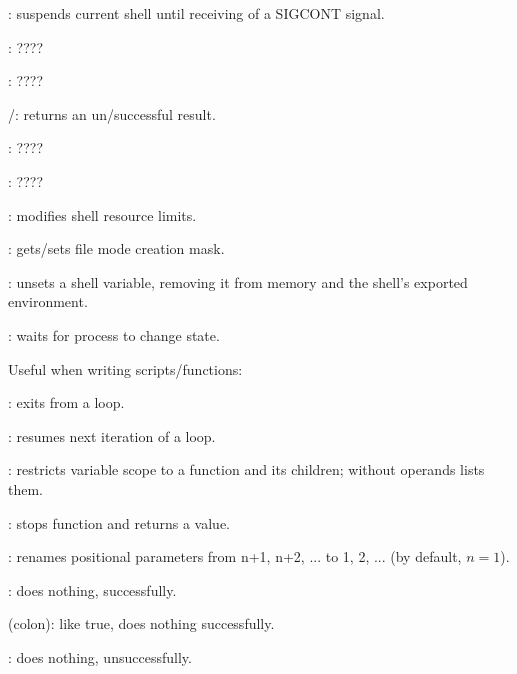 \begin{compactenum}
\item [\symbolbash] : suspends current shell until receiving of a SIGCONT signal.

\item [\symbolbash] : \dotfill ????

\item [\symbolbash] : \dotfill ????

\item [\symbolbash] /: returns an un/successful result.

\item [\symbolbash] : \dotfill ????

\item [\symbolbash] : \dotfill ????

\item [\symbolbash] : modifies shell resource limits.

\item [\symbolbash] : gets/sets file mode creation mask.

\item [\symbolbash] : unsets a shell variable, removing it from memory and the shell's exported environment.

\item [\symbolbash] : waits for process to change state.
\end{compactenum}

Useful when writing scripts/functions:

\begin{compactenum}
\item [\symbolbash] : exits from a loop.
\item [\symbolbash] : resumes next iteration of a loop.

\item [\symbolbash] : restricts variable scope to a function and its children; without operands lists them.

\item [\symbolbash] : stops function and returns a value.

\item [\symbolbash] : renames positional parameters from n+1, n+2, ... to 1, 2, ... (by default, $n = 1$).

\item [\symbolbash] : does nothing, successfully.
\item [\symbolbash] \commandbash{:} (colon): like true, does nothing successfully.
\item [\symbolbash] : does nothing, unsuccessfully.
\end{compactenum}

%